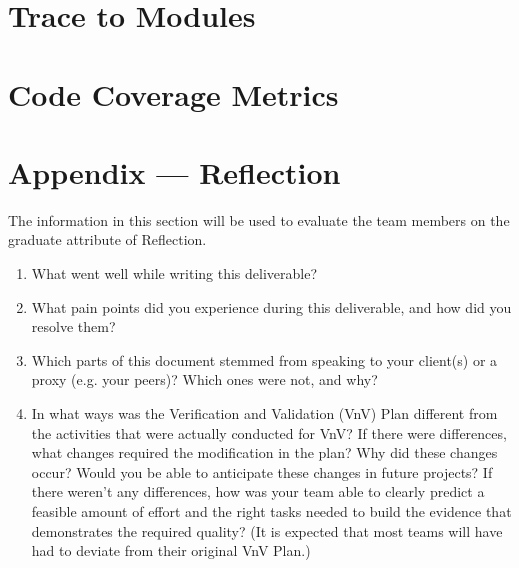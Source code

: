 \documentclass[12pt, titlepage]{article}
\begin{document}
\section{Trace to Modules}		

\section{Code Coverage Metrics}




\newpage{}
\section*{Appendix --- Reflection}

The information in this section will be used to evaluate the team members on the
graduate attribute of Reflection.



\begin{enumerate}
  \item What went well while writing this deliverable? 
  \item What pain points did you experience during this deliverable, and how
    did you resolve them?
  \item Which parts of this document stemmed from speaking to your client(s) or
  a proxy (e.g. your peers)? Which ones were not, and why?
  \item In what ways was the Verification and Validation (VnV) Plan different
  from the activities that were actually conducted for VnV?  If there were
  differences, what changes required the modification in the plan?  Why did
  these changes occur?  Would you be able to anticipate these changes in future
  projects?  If there weren't any differences, how was your team able to clearly
  predict a feasible amount of effort and the right tasks needed to build the
  evidence that demonstrates the required quality?  (It is expected that most
  teams will have had to deviate from their original VnV Plan.)
\end{enumerate}
\end{document}
